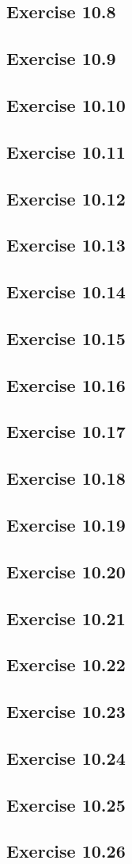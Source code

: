 \documentclass[a4paper,12pt]{article}
\begin{document}
\subsection*{Exercise 10.8}
\subsection*{Exercise 10.9}
\subsection*{Exercise 10.10}
\subsection*{Exercise 10.11}
\subsection*{Exercise 10.12}
\subsection*{Exercise 10.13}
\subsection*{Exercise 10.14}
\subsection*{Exercise 10.15}
\subsection*{Exercise 10.16}
\subsection*{Exercise 10.17}
\subsection*{Exercise 10.18}
\subsection*{Exercise 10.19}
\subsection*{Exercise 10.20}
\subsection*{Exercise 10.21}
\subsection*{Exercise 10.22}
\subsection*{Exercise 10.23}
\subsection*{Exercise 10.24}
\subsection*{Exercise 10.25}
\subsection*{Exercise 10.26}
\end{document}
